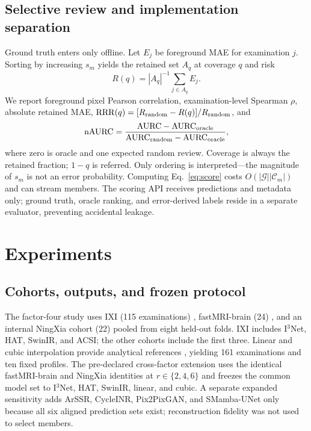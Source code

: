 \documentclass{article}
\begin{document}
\subsection{Selective review and implementation separation}
Ground truth enters only offline. Let $E_j$ be foreground MAE for examination $j$. Sorting by increasing $s_m$ yields the retained set $A_q$ at coverage $q$ and risk
\begin{equation}
 R(q)=|A_q|^{-1}\sum_{j\in A_q}E_j.
\end{equation}
We report foreground pixel Pearson correlation, examination-level Spearman $\rho$, absolute retained MAE, $\mathrm{RRR}(q)=[R_{\rm random}-R(q)]/R_{\rm random}$, and
\begin{equation}
 \mathrm{nAURC}=\frac{\mathrm{AURC}-\mathrm{AURC}_{\rm oracle}}
 {\mathrm{AURC}_{\rm random}-\mathrm{AURC}_{\rm oracle}},
 \label{eq:naurc}
\end{equation}
where zero is oracle and one expected random review. Coverage is always the retained fraction; $1-q$ is referred. Only ordering is interpreted---the magnitude of $s_m$ is not an error probability. Computing Eq.~\eqref{eq:score} costs $O(|\mathcal G||\mathcal C_m|)$ and can stream members. The scoring API receives predictions and metadata only; ground truth, oracle ranking, and error-derived labels reside in a separate evaluator, preventing accidental leakage.

\section{Experiments}
\subsection{Cohorts, outputs, and frozen protocol}
The factor-four study uses IXI (115 examinations) \cite{ixi}, fastMRI-brain (24) \cite{zbontar2018fastmri}, and an internal NingXia cohort (22) pooled from eight held-out folds. IXI includes I$^3$Net, HAT, SwinIR, and ACSI; the other cohorts include the first three. Linear and cubic interpolation provide analytical references \cite{keys1981cubic,thevenaz2000interpolation,unser1999splines}, yielding 161 examinations and ten fixed profiles. The pre-declared cross-factor extension uses the identical fastMRI-brain and NingXia identities at $r\in\{2,4,6\}$ and freezes the common model set to I$^3$Net, HAT, SwinIR, linear, and cubic. A separate expanded sensitivity adds ArSSR, CycleINR, Pix2PixGAN, and SMamba-UNet only because all six aligned prediction sets exist; reconstruction fidelity was not used to select members.
\end{document}
